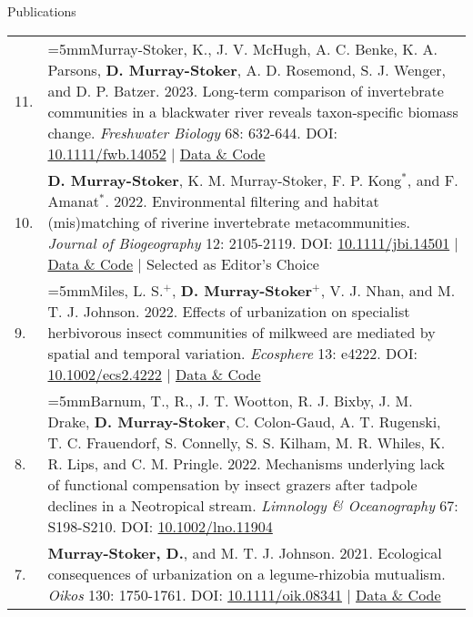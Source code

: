 \documentclass[letterpaper,11pt,oneside]{article}
\begin{document}
\bigskip





\noindent\Large{Publications}  
\normalsize
\bigskip

\def\arraystretch{1.4}
\noindent
\begin{longtable}{@{} p{0.5cm} >{\raggedright\arraybackslash}p{16.7cm}}
11. & \hangindent=5mmMurray-Stoker, K., J. V. McHugh, A. C. Benke, K. A. Parsons, \textbf{D. Murray-Stoker}, A. D. Rosemond, S. J. Wenger, and D. P. Batzer. 2023. Long-term comparison of invertebrate communities in a blackwater river reveals taxon-specific biomass change. \textit{Freshwater Biology} 68: 632-644. DOI: {\href{https://onlinelibrary.wiley.com/doi/abs/10.1111/fwb.14052}{10.1111/fwb.14052}} | {\href{https://zenodo.org/record/7455905#.Y8F1BezMIbk}{Data \& Code}}\\
10. & \hangindent=5mm\textbf{D. Murray-Stoker}, K. M. Murray-Stoker, F. P. Kong$^{*}$, and F. Amanat$^{*}$. 2022. Environmental filtering and habitat (mis)matching of riverine invertebrate metacommunities. \textit{Journal of Biogeography} 12: 2105-2119. DOI: {\href{http://onlinelibrary.wiley.com/doi/abs/10.1111/jbi.14501}{10.1111/jbi.14501}} | {\href{https://zenodo.org/record/6800554#.Ys9CNOzML0o}{Data \& Code}} | Selected as Editor's Choice \\
9. & \hangindent=5mmMiles, L. S.$^{+}$, \textbf{D. Murray-Stoker}$^{+}$, V. J. Nhan, and M. T. J. Johnson. 2022. Effects of urbanization on specialist herbivorous insect communities of milkweed are mediated by spatial and temporal variation. \textit{Ecosphere} 13: e4222. DOI: {\href{http://onlinelibrary.wiley.com/doi/abs/10.1002/ecs2.4222}{10.1002/ecs2.4222}} | {\href{https://zenodo.org/record/6474064#.Ys9CEezML0o}{Data \& Code}} \\
8. & \hangindent=5mmBarnum, T., R., J. T. Wootton, R. J. Bixby, J. M. Drake, \textbf{D. Murray-Stoker}, C. Colon-Gaud, A. T. Rugenski, T. C. Frauendorf, S. Connelly, S. S. Kilham, M. R. Whiles, K. R. Lips, and C. M. Pringle. 2022. Mechanisms underlying lack of functional compensation by insect grazers after tadpole declines in a Neotropical stream. \textit{Limnology \& Oceanography} 67: S198-S210. DOI: {\href{https://aslopubs.onlinelibrary.wiley.com/doi/full/10.1002/lno.11904}{10.1002/lno.11904}} \\
7. & \hangindent=5mm\textbf{Murray-Stoker, D.}, and M. T. J. Johnson. 2021. Ecological consequences of urbanization on a legume-rhizobia mutualism. \textit{Oikos} 130: 1750-1761. DOI: {\href{https://onlinelibrary.wiley.com/doi/full/10.1111/oik.08341}{10.1111/oik.08341}} | {\href{https://zenodo.org/record/4459724#.YmVqvfPMIbl}{Data \& Code}} \\

\end{longtable}
\end{document}
